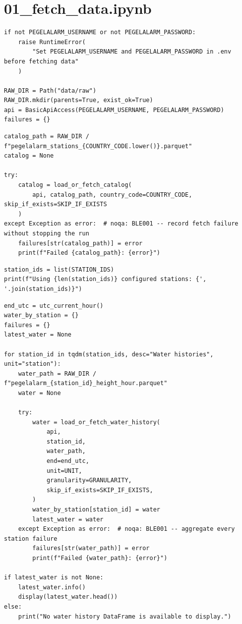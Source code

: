 \section{01\_fetch\_data.ipynb}

\begin{verbatim}
if not PEGELALARM_USERNAME or not PEGELALARM_PASSWORD:
    raise RuntimeError(
        "Set PEGELALARM_USERNAME and PEGELALARM_PASSWORD in .env before fetching data"
    )

RAW_DIR = Path("data/raw")
RAW_DIR.mkdir(parents=True, exist_ok=True)
api = BasicApiAccess(PEGELALARM_USERNAME, PEGELALARM_PASSWORD)
failures = {}
\end{verbatim}

\begin{verbatim}
catalog_path = RAW_DIR / f"pegelalarm_stations_{COUNTRY_CODE.lower()}.parquet"
catalog = None

try:
    catalog = load_or_fetch_catalog(
        api, catalog_path, country_code=COUNTRY_CODE, skip_if_exists=SKIP_IF_EXISTS
    )
except Exception as error:  # noqa: BLE001 -- record fetch failure without stopping the run
    failures[str(catalog_path)] = error
    print(f"Failed {catalog_path}: {error}")
\end{verbatim}

\begin{verbatim}
station_ids = list(STATION_IDS)
print(f"Using {len(station_ids)} configured stations: {', '.join(station_ids)}")
\end{verbatim}

\begin{verbatim}
end_utc = utc_current_hour()
water_by_station = {}
failures = {}
latest_water = None

for station_id in tqdm(station_ids, desc="Water histories", unit="station"):
    water_path = RAW_DIR / f"pegelalarm_{station_id}_height_hour.parquet"
    water = None

    try:
        water = load_or_fetch_water_history(
            api,
            station_id,
            water_path,
            end=end_utc,
            unit=UNIT,
            granularity=GRANULARITY,
            skip_if_exists=SKIP_IF_EXISTS,
        )
        water_by_station[station_id] = water
        latest_water = water
    except Exception as error:  # noqa: BLE001 -- aggregate every station failure
        failures[str(water_path)] = error
        print(f"Failed {water_path}: {error}")

if latest_water is not None:
    latest_water.info()
    display(latest_water.head())
else:
    print("No water history DataFrame is available to display.")
\end{verbatim}

